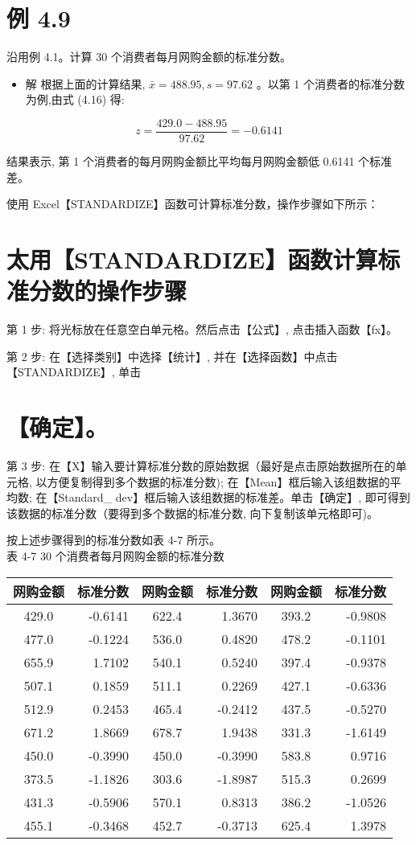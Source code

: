\documentclass[10pt]{article}
\begin{document}
\begin{CJK*}{UTF8}{bsmi}
\section*{例 4.9}
沿用例 4.1。计算 30 个消费者每月网购金额的标准分数。

\begin{itemize}
  \item 解 根据上面的计算结果, $\bar{x}=488.95, s=97.62$ 。以第 1 个消费者的标准分数为例,由式 (4.16) 得:
\end{itemize}

$$
z=\frac{429.0-488.95}{97.62}=-0.6141
$$

结果表示, 第 1 个消费者的每月网购金额比平均每月网购金额低 0.6141 个标准差。

使用 Excel【STANDARDIZE】函数可计算标准分数，操作步骤如下所示：

\section*{太用【STANDARDIZE】函数计算标准分数的操作步骤}
第 1 步: 将光标放在任意空白单元格。然后点击【公式】, 点击插入函数【fx】。

第 2 步: 在【选择类别】中选择【统计】, 并在【选择函数】中点击【STANDARDIZE】, 单击

\section*{【确定】。}
第 3 步: 在【X】输入要计算标准分数的原始数据（最好是点击原始数据所在的单元格, 以方便复制得到多个数据的标准分数); 在【Mean】框后输入该组数据的平均数; 在【Standard\_ dev】框后输入该组数据的标准差。单击【确定】, 即可得到该数据的标准分数（要得到多个数据的标准分数, 向下复制该单元格即可)。

按上述步骤得到的标准分数如表 4-7 所示。\\
表 4-7 30 个消费者每月网购金额的标准分数

\begin{center}
\begin{tabular}{cr||cr||cr}
\hline
网购金额 & 标准分数 & 网购金额 & 标准分数 & 网购金额 & 标准分数 \\
\hline
429.0 & -0.6141 & 622.4 & 1.3670 & 393.2 & -0.9808 \\
477.0 & -0.1224 & 536.0 & 0.4820 & 478.2 & -0.1101 \\
655.9 & 1.7102 & 540.1 & 0.5240 & 397.4 & -0.9378 \\
507.1 & 0.1859 & 511.1 & 0.2269 & 427.1 & -0.6336 \\
512.9 & 0.2453 & 465.4 & -0.2412 & 437.5 & -0.5270 \\
671.2 & 1.8669 & 678.7 & 1.9438 & 331.3 & -1.6149 \\
450.0 & -0.3990 & 450.0 & -0.3990 & 583.8 & 0.9716 \\
373.5 & -1.1826 & 303.6 & -1.8987 & 515.3 & 0.2699 \\
431.3 & -0.5906 & 570.1 & 0.8313 & 386.2 & -1.0526 \\
455.1 & -0.3468 & 452.7 & -0.3713 & 625.4 & 1.3978 \\
\hline
\end{tabular}
\end{center}


\end{CJK*}
\end{document}
